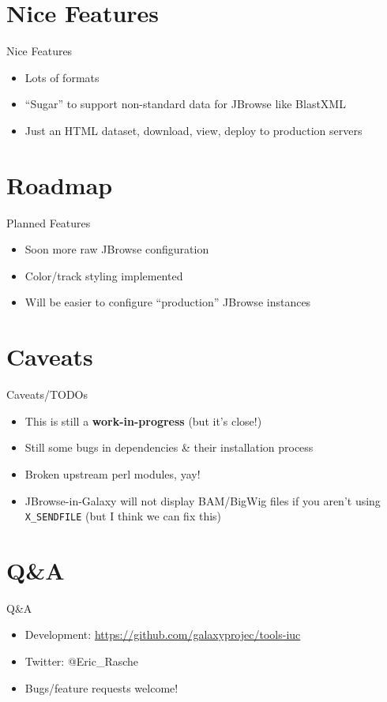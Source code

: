 \documentclass[12pt]{beamer} %
\begin{document}
\section{Nice Features}
\begin{frame}{Nice Features}
	\begin{itemize}
        \item Lots of formats
        \item ``Sugar'' to support non-standard data for JBrowse like BlastXML
        \item Just an HTML dataset, download, view, deploy to production servers
    \end{itemize}
\end{frame}

\section{Roadmap}
\begin{frame}{Planned Features}
	\begin{itemize}
        \item Soon more raw JBrowse configuration
        \item Color/track styling implemented
        \item Will be easier to configure ``production'' JBrowse instances
    \end{itemize}
\end{frame}

\section{Caveats}
\begin{frame}{Caveats/TODOs}
	\begin{itemize}
    	\item This is still a \textbf{work-in-progress} (but it's close!)
        \item Still some bugs in dependencies \& their installation process
        \item Broken upstream perl modules, yay! 
        \item JBrowse-in-Galaxy will not display BAM/BigWig files if you aren't using \texttt{X\_SENDFILE} (but I think we can fix this)
    \end{itemize}
\end{frame}



\section{Q\&A}
\begin{frame}{Q\&A}
	\begin{itemize}
    	\item Development: \url{https://github.com/galaxyprojec/tools-iuc}
        \item Twitter: @Eric\_Rasche
        \item Bugs/feature requests welcome!
    \end{itemize}
\end{frame}
\end{document}
